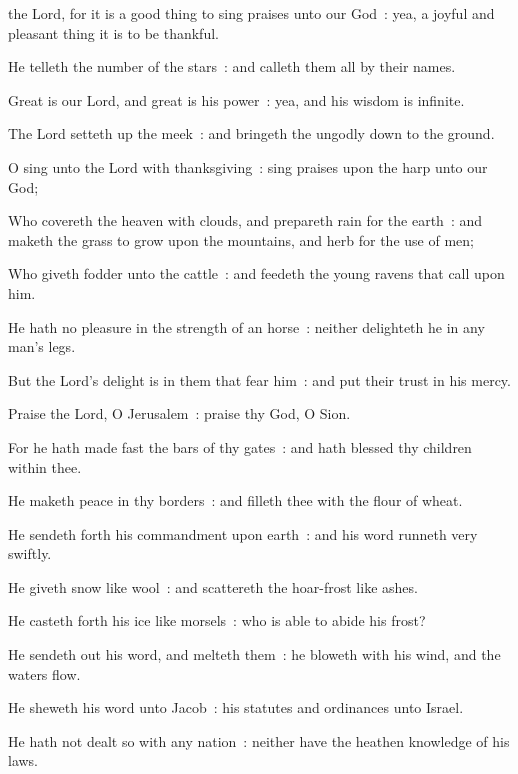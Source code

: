  the Lord, for it is a good thing to sing praises unto our God~: yea, a joyful and pleasant thing it is to be thankful.\par
{}
He telleth the number of the stars~: and calleth them all by their names.\par
{}Great is our Lord, and great is his power~: yea, and his wisdom is infinite.\par
{}The Lord setteth up the meek~: and bringeth the ungodly down to the ground.\par
{}O sing unto the Lord with thanksgiving~: sing praises upon the harp unto our God;\par
{}Who covereth the heaven with clouds, and prepareth rain for the earth~: and maketh the grass to grow upon the mountains, and herb for the use of men;\par
{}Who giveth fodder unto the cattle~: and feedeth the young ravens that call upon him.\par
{}He hath no pleasure in the strength of an horse~: neither delighteth he in any man's legs.\par
{}But the Lord's delight is in them that fear him~: and put their trust in his mercy.\par
{}Praise the Lord, O Jerusalem~: praise thy God, O Sion.\par
{}For he hath made fast the bars of thy gates~: and hath blessed thy children within thee.\par
{}He maketh peace in thy borders~: and filleth thee with the flour of wheat.\par
{}He sendeth forth his commandment upon earth~: and his word runneth very swiftly.\par
{}He giveth snow like wool~: and scattereth the hoar-frost like ashes.\par
{}He casteth forth his ice like morsels~: who is able to abide his frost?\par
{}He sendeth out his word, and melteth them~: he bloweth with his wind, and the waters flow.\par
{}He sheweth his word unto Jacob~: his statutes and ordinances unto Israel.\par
{}He hath not dealt so with any nation~: neither have the heathen knowledge of his laws.\par

